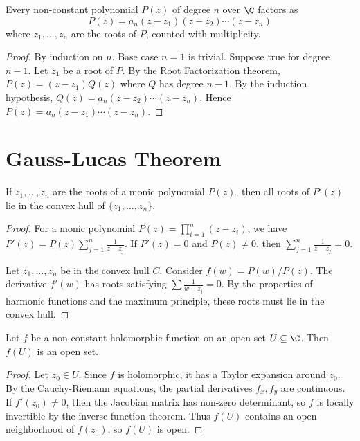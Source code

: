 \begin{theorem}
\label{thm:poly-factorization}
Every non-constant polynomial $P(z)$ of degree $n$ over $\C$ factors as
\[ P(z) = a_n (z-z_1)(z-z_2)\cdots(z-z_n) \]
where $z_1, \dots, z_n$ are the roots of $P$, counted with multiplicity.

\begin{proof}
By induction on $n$. Base case $n=1$ is trivial. Suppose true for degree $n-1$. Let $z_1$ be a root of $P$. By the Root Factorization theorem, $P(z) = (z-z_1)Q(z)$ where $Q$ has degree $n-1$. By the induction hypothesis, $Q(z) = a_n(z-z_2)\cdots(z-z_n)$. Hence $P(z) = a_n(z-z_1)\cdots(z-z_n)$.
\end{proof}

\end{theorem}

\section{Gauss-Lucas Theorem}
\label{sec:gauss-lucas}

\begin{theorem}
\label{thm:gauss-lucas}
If $z_1, \dots, z_n$ are the roots of a monic polynomial $P(z)$, then all roots of $P'(z)$ lie in the convex hull of $\{z_1, \dots, z_n\}$.

\begin{proof}
For a monic polynomial $P(z) = \prod_{i=1}^n (z-z_i)$, we have $P'(z) = P(z) \sum_{j=1}^n \frac{1}{z-z_j}$. If $P'(z) = 0$ and $P(z) \neq 0$, then $\sum_{j=1}^n \frac{1}{z-z_j} = 0$.

Let $z_1, \dots, z_n$ be in the convex hull $C$. Consider $f(w) = P(w)/P(z)$. The derivative $f'(w)$ has roots satisfying $\sum \frac{1}{w-z_j} = 0$. By the properties of harmonic functions and the maximum principle, these roots must lie in the convex hull.
\end{proof}

\end{theorem}

\begin{theorem}
\label{thm:open-mapping}
Let $f$ be a non-constant holomorphic function on an open set $U \subseteq \C$. Then $f(U)$ is an open set.

\begin{proof}
Let $z_0 \in U$. Since $f$ is holomorphic, it has a Taylor expansion around $z_0$. By the Cauchy-Riemann equations, the partial derivatives $f_x, f_y$ are continuous. If $f'(z_0) \neq 0$, then the Jacobian matrix has non-zero determinant, so $f$ is locally invertible by the inverse function theorem. Thus $f(U)$ contains an open neighborhood of $f(z_0)$, so $f(U)$ is open.
\end{proof}

\end{theorem}

